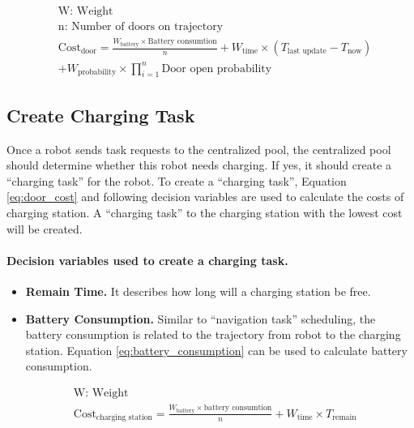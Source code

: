 \begin{equation}
 \label{eq:door_cost}
 \begin{aligned}
 & \mbox{W: Weight } \\
 & \mbox{n: Number of doors on trajectory} \\ 
 & \mbox{Cost}_{\mbox{door}} = \frac{W_{\mbox{battery}} \times \mbox{Battery consumtion}}{n} + W_{\mbox{time}} \times (T_{\mbox{last update}} - T_{\mbox{now}}) \\
 & + W_{\mbox{probability}} \times \prod\limits_{i=1}^n \mbox{Door open probability}
 \end{aligned}
\end{equation}





\subsection{Create Charging Task}
\label{sec:create_charging_task}
Once a robot sends task requests to the centralized pool, the centralized pool should determine whether this robot needs charging. If yes, it should create a ``charging task'' for the robot. 
To create a ``charging task'', Equation \ref{eq:door_cost} and following decision variables are used to calculate the costs of charging station. A ``charging task'' to the charging station with the lowest cost will be created.


\paragraph{Decision variables used to create a charging task.}
\begin{itemize}
 \item \textbf{Remain Time.} It describes how long will a charging station be free. 
 \item \textbf{Battery Consumption.} Similar to ``navigation task'' scheduling, the battery consumption is related to the trajectory from robot to the charging station. Equation \ref{eq:battery_consumption} can be used to calculate battery consumption.
\end{itemize}

\begin{equation} 
\label{eq:charging_station_cost}
\begin{aligned}
 & \mbox{W: Weight } \\
 & \mbox{Cost}_{\mbox{charging station}} = \frac{W_{\mbox{battery}} \times \mbox{battery consumtion}}{n} + W_{\mbox{time}} \times T_{\mbox{remain}}
\end{aligned}
\end{equation}


